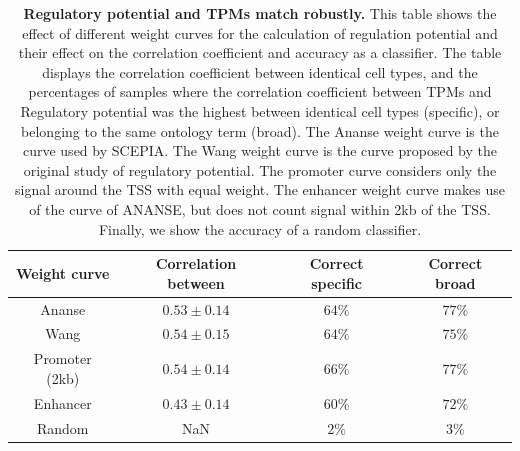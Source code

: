 \begin{table}[H]
    \centering
    \caption{\textbf{Regulatory potential and TPMs match robustly.} This table shows the effect of different weight curves for the calculation of regulation potential and their effect on the correlation coefficient and accuracy as a classifier. The table displays the correlation coefficient between identical cell types, and the percentages of samples where the correlation coefficient between TPMs and Regulatory potential was the highest between identical cell types (specific), or belonging to the same ontology term (broad). The Ananse weight curve is the curve used by SCEPIA. The Wang weight curve is the curve proposed by the original study of regulatory potential. The promoter curve considers only the signal around the TSS with equal weight. The enhancer weight curve makes use of the curve of ANANSE, but does not count signal within 2kb of the TSS. Finally, we show the accuracy of a random classifier.}
    \begin{tabular}{||c c c c||} 
        \hline
        Weight curve & Correlation between & Correct specific & Correct broad \\[0.5ex] \hline
        Ananse\cite{Xu_2020}& $0.53 \pm 0.14$ & $64\%$ & $77\%$ \\ \hline
        Wang\cite{Wang2016} & $0.54 \pm 0.15 $ & $64\%$ & $75\%$ \\ \hline
        Promoter (2kb) & $0.54 \pm 0.14$ & $66\%$ & $77\%$ \\ \hline
        Enhancer & $0.43 \pm 0.14$ & $60\%$ & $72\%$ \\ \hline
        Random & NaN & $2\%$ & $3\%$ \\ \hline
    \end{tabular}
    \label{table:correlations}
\end{table}

\begin{table}[H]
    \centering
    \caption{\textbf{SCEPIA output for \textit{MEF2}-family factors}. Correlation table output of SCEPIA run on the whole hHCA dataset, selected for the absolute highest correlating motif for each of the \textit{MEF2} factors.}
    \label{tab:corrtable_SCEPIA}
\end{table}

